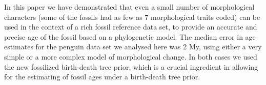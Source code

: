 \documentclass[11pt]{article}
\begin{document}
In this paper we have demonstrated that even a small number of morphological characters (some of the fossils had as few as 7 morphological traits coded) can be used in the context of a rich fossil reference data set, to provide an accurate and precise age of the fossil based on a phylogenetic model. The median error in age estimates for the penguin data set we analysed here was 2 My, using either a very simple or a more complex model of morphological change. In both cases we used the new fossilized birth-death tree prior, which is a crucial ingredient in allowing for the estimating of fossil ages under a birth-death tree prior.

\printbibliography
\end{document}
